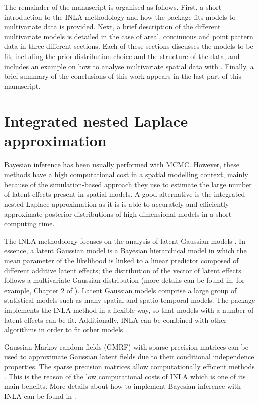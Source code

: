 \medskip
The remainder of the manuscript is organised as follows. First, a short introduction to the INLA methodology and how the  package fits models to multivariate data is provided. Next, a brief description of the different multivariate models is detailed in the case of areal, continuous and point pattern data in three different sections. Each of these sections discusses the models to be fit, including the prior distribution choice and the structure of the data, and includes an example on how to analyse multivariate spatial data with . Finally, a brief summary of the conclusions of this work appears in the last part of this manuscript.


\section{Integrated nested Laplace approximation}
\label{sec:INLA}

\medskip
Bayesian inference has been usually performed with MCMC. However, these methods have a high computational cost in a spatial modelling context, mainly because of the simulation-based approach they use to estimate the large number of latent effects present in spatial models. A good alternative is the integrated nested Laplace approximation \citep[INLA,][]{INLA} as it is is able to accurately and efficiently approximate posterior distributions of high-dimensional models in a short computing time.

\medskip
The INLA methodology focuses on the analysis of latent Gaussian models \citep{rueheld:2005}. In essence, a latent Gaussian model is a Bayesian hierarchical model in which the mean parameter of the likelihood is linked to a linear predictor
composed of different additive latent effects; the distribution of the vector
of latent effects follows a multivariate Gaussian distribution (more details can be found in, for example, Chapter 2 of \citealp{rueheld:2005}). Latent Gaussian models comprise a large group of statistical models such as many spatial and spatio-temporal models. The  package implements the INLA method in a flexible way, so that models with a number of latent effects can be fit. Additionally, INLA can be combined with other algorithms in order to fit other models \citep{GomezRubioPalmiPerales:2018}.

\medskip
Gaussian Markov random fields (GMRF) with sparse precision matrices can be used to approximate Gaussian latent fields due to their conditional independence properties. The sparse precision matrices allow computationally efficient methods \citep{rueheld:2005}. This is the reason of the low computational costs of INLA which is one of its main benefits. More details about how to implement Bayesian inference with INLA can be found in \citep{gomez2020bayesian}. 


